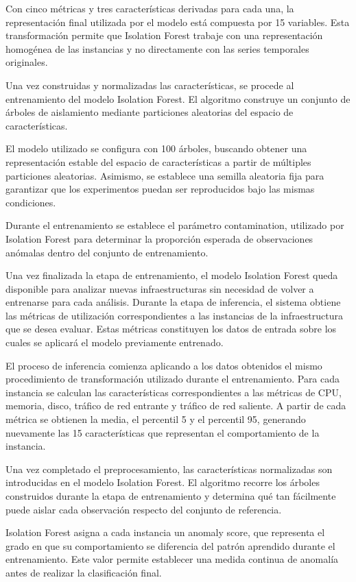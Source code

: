 Con cinco métricas y tres características derivadas para cada una, la
representación final utilizada por el modelo está compuesta por 15
variables. Esta transformación permite que Isolation Forest trabaje con
una representación homogénea de las instancias y no directamente con las
series temporales originales.

Una vez construidas y normalizadas las características, se procede al
entrenamiento del modelo Isolation Forest. El algoritmo construye un
conjunto de árboles de aislamiento mediante particiones aleatorias del
espacio de características.

El modelo utilizado se configura con 100 árboles, buscando obtener una
representación estable del espacio de características a partir de
múltiples particiones aleatorias. Asimismo, se establece una semilla
aleatoria fija para garantizar que los experimentos puedan ser
reproducidos bajo las mismas condiciones.

Durante el entrenamiento se establece el parámetro contamination,
utilizado por Isolation Forest para determinar la proporción esperada de
observaciones anómalas dentro del conjunto de entrenamiento.

Una vez finalizada la etapa de entrenamiento, el modelo Isolation Forest
queda disponible para analizar nuevas infraestructuras sin necesidad de
volver a entrenarse para cada análisis. Durante la etapa de inferencia,
el sistema obtiene las métricas de utilización correspondientes a las
instancias de la infraestructura que se desea evaluar. Estas métricas
constituyen los datos de entrada sobre los cuales se aplicará el modelo
previamente entrenado.

El proceso de inferencia comienza aplicando a los datos obtenidos el
mismo procedimiento de transformación utilizado durante el
entrenamiento. Para cada instancia se calculan las características
correspondientes a las métricas de CPU, memoria, disco, tráfico de red
entrante y tráfico de red saliente. A partir de cada métrica se obtienen
la media, el percentil 5 y el percentil 95, generando nuevamente las 15
características que representan el comportamiento de la instancia.

Una vez completado el preprocesamiento, las características normalizadas
son introducidas en el modelo Isolation Forest. El algoritmo recorre los
árboles construidos durante la etapa de entrenamiento y determina qué
tan fácilmente puede aislar cada observación respecto del conjunto de
referencia.

Isolation Forest asigna a cada instancia un anomaly score, que
representa el grado en que su comportamiento se diferencia del patrón
aprendido durante el entrenamiento. Este valor permite establecer una
medida continua de anomalía antes de realizar la clasificación final.

